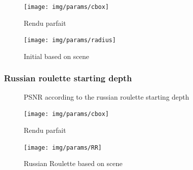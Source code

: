 \documentclass{beamer}
\begin{document}
\begin{frame}
    \begin{figure}
        \texttt{[image: img/params/cbox]}
        \caption{Rendu parfait}
    \end{figure}
\end{frame}
\begin{frame}
    \begin{figure}
        \texttt{[image: img/params/radius]}
        \caption{Initial based on scene}
    \end{figure}
\end{frame}
\begin{frame}
    \frametitle{Russian roulette starting depth}
    \begin{minipage}{0.5\textwidth}
    \end{minipage}
    \begin{minipage}{\textwidth}
        \begin{figure}
            \centering
            \caption{PSNR according to the russian roulette starting depth}
        \end{figure}
    \end{minipage}
\end{frame}
\begin{frame}
    \begin{figure}
        \texttt{[image: img/params/cbox]}
        \caption{Rendu parfait}
    \end{figure}
\end{frame}
\begin{frame}
    \begin{figure}
        \texttt{[image: img/params/RR]}
        \caption{Russian Roulette based on scene}
    \end{figure}
\end{frame}
\end{document}

